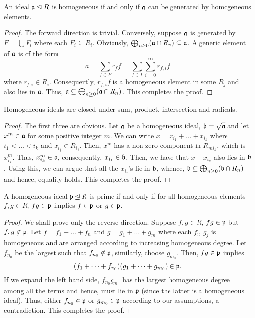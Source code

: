 \begin{proposition}
    An ideal $\mathfrak a\unlhd R$ is homogeneous if and only if $\mathfrak a$ can be generated by homogeneous elements.
\end{proposition}
\begin{proof}
    The forward direction is trivial. Conversely, suppose $\mathfrak a$ is generated by $F = \bigcup F_i$ where each $F_i\subseteq R_i$. Obviously, $\bigoplus_{n\ge 0}(\mathfrak a\cap R_n)\subseteq\mathfrak a$. A generic element of $\mathfrak a$ is of the form 
    \begin{equation*}
        a = \sum_{f\in F}r_f f = \sum_{f\in F}\sum_{i = 0}^\infty r_{f,i}f
    \end{equation*}
    where $r_{f, i}\in R_i$. Consequently, $r_{f, i}f$ is a homogeneous element in some $R_j$ and also lies in $\mathfrak a$. Thus, $\mathfrak a\subseteq\bigoplus_{n\ge 0}(\mathfrak a\cap R_n)$. This completes the proof.
\end{proof}

\begin{proposition}
    Homogeneous ideals are closed under sum, product, intersection and radicals.
\end{proposition}
\begin{proof}
    The first three are obvious. Let $\mathfrak a$ be a homogeneous ideal, $\mathfrak b = \sqrt{\mathfrak a}$ and let $x^m\in\mathfrak a$ for some positive integer $m$. We can write $x = x_{i_1} + \dots + x_{i_k}$ where $i_1 < \dots < i_k$ and $x_{i_j}\in R_{i_j}$. Then, $x^m$ has a non-zero component in $R_{mi_k}$, which is $x_{i_k}^m$. Thus, $x_{i_k}^m\in\mathfrak a$, consequently, $x_{i_k}\in\mathfrak b$. Then, we have that $x - x_{i_k}$ also lies in $\mathfrak b$. Using this, we can argue that all the $x_{i_j}$'s lie in $\mathfrak b$, whence, $\mathfrak b\subseteq\bigoplus_{n\ge 0}(\mathfrak b\cap R_n)$ and hence, equality holds. This completes the proof.
\end{proof}

\begin{proposition}
    A homogeneous ideal $\mathfrak p\unlhd R$ is prime if and only if for all homogeneous elements $f,g\in R$, $fg\in\mathfrak p$ implies $f\in\mathfrak p$ or $g\in\mathfrak p$.
\end{proposition}
\begin{proof}
    We shall prove only the reverse direction. Suppose $f,g\in R$, $fg\in\mathfrak p$ but $f,g\notin\mathfrak p$. Let $f = f_1 + \dots + f_n$ and $g = g_1 + \dots + g_m$ where each $f_i$, $g_j$ is homogeneous and are arranged according to increasing homogeneous degree. Let $f_{n_0}$ be the largest such that $f_{n_0}\notin\mathfrak p$, similarly, choose $g_{m_0}$. Then, $fg\in\mathfrak p$ implies 
    \begin{equation*}
        (f_1 + \dots + f_{n_0})(g_1 + \dots + g_{m_0})\in\mathfrak p.
    \end{equation*}
    If we expand the left hand side, $f_{n_0}g_{m_0}$ has the largest homogeneous degree among all the terms and hence, must lie in $\mathfrak p$ (since the latter is a homogeneous ideal). Thus, either $f_{n_0}\in\mathfrak p$ or $g_{m_0}\in\mathfrak p$ according to our assumptions, a contradiction. This completes the proof.
\end{proof}

